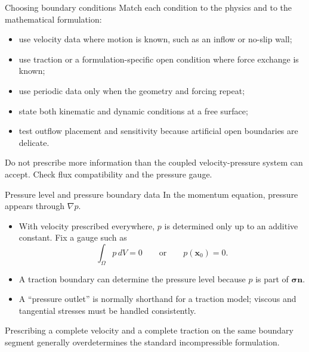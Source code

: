 \documentclass[aspectratio=169,11pt]{beamer}
\newcommand{\xvec}{\bm{x}}
\newcommand{\nvec}{\bm{n}}
\newcommand{\stress}{\bm{\sigma}}
\begin{document}
\begin{frame}{Choosing boundary conditions}
Match each condition to the physics and to the mathematical formulation:
\begin{itemize}\itemsep6pt
  \item use velocity data where motion is known, such as an inflow or no-slip wall;
  \item use traction or a formulation-specific open condition where force exchange is known;
  \item use periodic data only when the geometry and forcing repeat;
  \item state both kinematic and dynamic conditions at a free surface;
  \item test outflow placement and sensitivity because artificial open boundaries are delicate.
\end{itemize}
\begin{punchbox}
\small Do not prescribe more information than the coupled velocity-pressure system can accept. Check flux compatibility and the pressure gauge.
\end{punchbox}
\end{frame}

\begin{frame}{Pressure level and pressure boundary data}
In the momentum equation, pressure appears through $\nabla p$.
\begin{itemize}\itemsep6pt
  \item With velocity prescribed everywhere, $p$ is determined only up to an additive constant. Fix a gauge such as
  \[
    \int_\Omega p\,dV=0
    \qquad\text{or}\qquad
    p(\xvec_0)=0.
  \]
  \item A traction boundary can determine the pressure level because $p$ is part of $\stress\nvec$.
  \item A ``pressure outlet'' is normally shorthand for a traction model; viscous and tangential stresses must be handled consistently.
\end{itemize}

\begin{punchbox}
\small Prescribing a complete velocity and a complete traction on the same boundary segment generally overdetermines the standard incompressible formulation.
\end{punchbox}
\end{frame}
\end{document}
